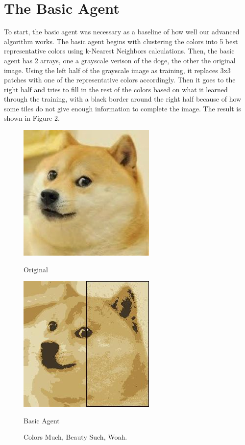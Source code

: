\documentclass[11pt]{article}
\begin{document}
\section{The Basic Agent}
To start, the basic agent was necessary as a baseline of how well our advanced algorithm works. The basic agent begins with clustering the colors into 5 best representative colors using k-Nearest Neighbors calculations. Then, the basic agent has 2 arrays, one a grayscale verison of the doge, the other the original image. Using the left half of the grayscale image as training, it replaces 3x3 patches with one of the representative colors accordingly. Then it goes to the right half and tries to fill in the rest of the colors based on what it learned through the training, with a black border around the right half because of how some tiles do not give enough information to complete the image. The result is shown in Figure 2.

\begin{figure}[h]
\begin{minipage}[c]{0.5\textwidth}
\centering
\includegraphics[scale=0.94]{images/smolDoge.jpg}
\begin{center}
Original
\end{center}
\end{minipage}
\begin{minipage}[c]{0.5\textwidth}
\centering
\includegraphics[scale=0.70]{images/basic.jpg}
\begin{center}
Basic Agent
\end{center}
\end{minipage}
\caption{Colors Much, Beauty Such, Woah.}
\end{figure}
\end{document}
